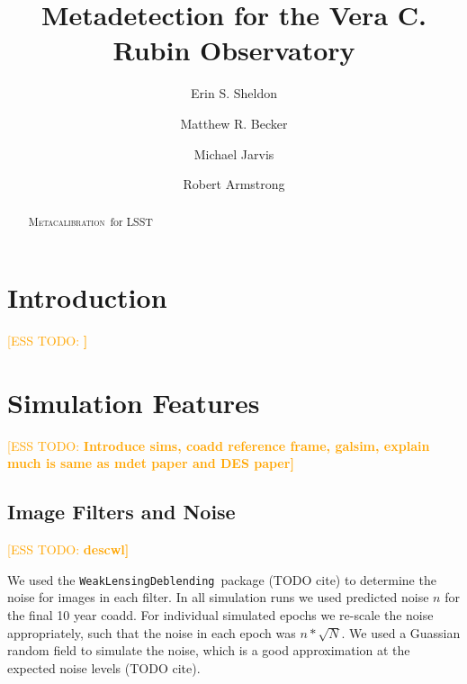 \documentclass[iop, twocolappendix, appendixfloats, numberedappendix, apj]{hackemulateapj}
\newcommand{\esstodo}[1]{\textcolor{orange}{[ESS TODO: \bf #1]}}
\newcommand{\descwl}{\texttt{WeakLensingDeblending}}
\newcommand{\Mcal}{\textsc{Metacalibration}}
\newcommand{\Mdet}{\textsc{Metadetection}}
\begin{document}



\title{Metadetection for the Vera C. Rubin Observatory}

\author{Erin S. Sheldon}
\author{Matthew R. Becker}
\author{Michael Jarvis}
\author{Robert Armstrong}


\begin{abstract}

    \Mcal\ for LSST

\end{abstract}


\section{Introduction} \label{sec:intro}

\esstodo{}

\section{Simulation Features} \label{sec:sim}

\esstodo{Introduce sims, coadd reference frame, galsim, explain much is same as
mdet paper and DES paper}

\subsection{Image Filters and Noise} \label{sec:sim:noise}
\esstodo{descwl}

We used the \descwl\ package (TODO cite) to determine the
noise for images in each filter.  In all simulation runs we used predicted
noise $n$ for the final 10 year coadd.  For individual simulated epochs we
re-scale the noise appropriately, such that the noise in each epoch was $n *
\sqrt{N}$.  We used a Guassian random field to simulate the noise, which is a
good approximation at the expected noise levels (TODO cite).
\end{document}
